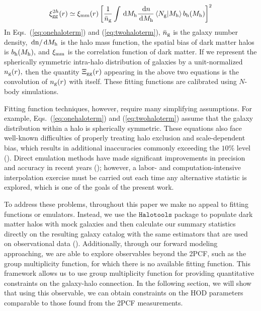 \begin{eqnarray}
\label{eq:twohaloterm}
\xi^{2h}_{\mathrm{gg}}(r) \simeq \xi_{\mathrm{mm}}(r)\left[\frac{1}{\bar{n}_{\mathrm{g}}}\int\,\mathrm{d}M_{\rm h}\frac{\,\mathrm{d} n}{\,\mathrm{d}M_{\rm h}} \left\langle N_{\mathrm{g}} \vert {M_{\rm h}}\right\rangle b_{\mathrm{h}}(M_{\rm h})\right]^{2}
\end{eqnarray}
In Eqs.~(\ref{eq:onehaloterm}) and (\ref{eq:twohaloterm}), $\bar{n}_{\mathrm{g}}$ is the galaxy number density,
$\,\mathrm{d}\mathrm{n}/\,\mathrm{d}M_{\rm h}$ is the halo mass function, the spatial bias of dark matter halos is 
$b_{\mathrm{h}}(M_{\rm h}),$ and $\xi_{\rm mm}$ is the correlation function of dark matter.  
If we represent the spherically symmetric intra-halo distribution of galaxies by a unit-normalized 
$n_{\rm g}(r),$ then the quantity $\Xi_{\rm gg}(r)$ appearing in the above two equations 
is the convolution of $n_{\rm g}(r)$ with itself. These fitting functions are calibrated using $N$-body 
simulations. 

Fitting function techniques, however, require many simplifying assumptions. For example, 
Eqs.~(\ref{eq:onehaloterm}) and (\ref{eq:twohaloterm}) assume that the galaxy 
distribution within a halo is spherically symmetric. These equations 
also face well-known difficulties of properly treating halo exclusion and scale-dependent bias, 
which results in additional inaccuracies commonly exceeding the $10\%$ level (\citealt{vdBosch13}). 
Direct emulation methods have made significant improvements in precision and accuracy in recent 
years (\citealt{coyote2,coyote1}); however, a labor- and computation-intensive interpolation 
exercise must be carried out each time any alternative statistic is explored, which is one of the goals of the present work.

To address these problems, throughout this paper we make no appeal to fitting functions or emulators. 
Instead, we use the $\mathtt{Halotools}$ package to populate dark matter halos with mock galaxies and 
then calculate our summary statistics directly on the resulting galaxy catalog with the same estimators 
that are used on observational data (\citealt{Hearin:2016aa}). Additionally, through our forward modeling approaching, we are
able to explore observables beyond the 2PCF, such as the group multiplicity function, for which 
there is no available fitting function. This framework allows us to use group multiplicity function for providing quantitative constraints on the galaxy-halo connection. In the following section, we will show that using this observable, we can obtain constraints on the HOD parameters comparable to those found from the 2PCF measurements. 

